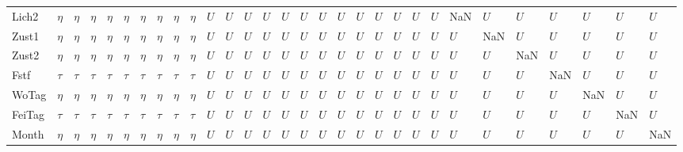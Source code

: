 \begin{tabular}{llllllllllllllllllllllllllllll}
Lich2  &    $\eta$ &    $\eta$ &    $\eta$ &    $\eta$ &    $\eta$ &    $\eta$ &    $\eta$ &    $\eta$ &    $\eta$ &     $U$ &     $U$ &     $U$ &     $U$ &     $U$ &     $U$ &     $U$ &     $U$ &     $U$ &       $U$ &     $U$ &     $U$ &     $U$ &     NaN &     $U$ &     $U$ &     $U$ &     $U$ &     $U$ &     $U$ \\
Zust1  &    $\eta$ &    $\eta$ &    $\eta$ &    $\eta$ &    $\eta$ &    $\eta$ &    $\eta$ &    $\eta$ &    $\eta$ &     $U$ &     $U$ &     $U$ &     $U$ &     $U$ &     $U$ &     $U$ &     $U$ &     $U$ &       $U$ &     $U$ &     $U$ &     $U$ &     $U$ &     NaN &     $U$ &     $U$ &     $U$ &     $U$ &     $U$ \\
Zust2  &    $\eta$ &    $\eta$ &    $\eta$ &    $\eta$ &    $\eta$ &    $\eta$ &    $\eta$ &    $\eta$ &    $\eta$ &     $U$ &     $U$ &     $U$ &     $U$ &     $U$ &     $U$ &     $U$ &     $U$ &     $U$ &       $U$ &     $U$ &     $U$ &     $U$ &     $U$ &     $U$ &     NaN &     $U$ &     $U$ &     $U$ &     $U$ \\
Fstf   &    $\tau$ &    $\tau$ &    $\tau$ &    $\tau$ &    $\tau$ &    $\tau$ &    $\tau$ &    $\tau$ &    $\tau$ &     $U$ &     $U$ &     $U$ &     $U$ &     $U$ &     $U$ &     $U$ &     $U$ &     $U$ &       $U$ &     $U$ &     $U$ &     $U$ &     $U$ &     $U$ &     $U$ &     NaN &     $U$ &     $U$ &     $U$ \\
WoTag  &    $\eta$ &    $\eta$ &    $\eta$ &    $\eta$ &    $\eta$ &    $\eta$ &    $\eta$ &    $\eta$ &    $\eta$ &     $U$ &     $U$ &     $U$ &     $U$ &     $U$ &     $U$ &     $U$ &     $U$ &     $U$ &       $U$ &     $U$ &     $U$ &     $U$ &     $U$ &     $U$ &     $U$ &     $U$ &     NaN &     $U$ &     $U$ \\
FeiTag &    $\tau$ &    $\tau$ &    $\tau$ &    $\tau$ &    $\tau$ &    $\tau$ &    $\tau$ &    $\tau$ &    $\tau$ &     $U$ &     $U$ &     $U$ &     $U$ &     $U$ &     $U$ &     $U$ &     $U$ &     $U$ &       $U$ &     $U$ &     $U$ &     $U$ &     $U$ &     $U$ &     $U$ &     $U$ &     $U$ &     NaN &     $U$ \\
Month  &    $\eta$ &    $\eta$ &    $\eta$ &    $\eta$ &    $\eta$ &    $\eta$ &    $\eta$ &    $\eta$ &    $\eta$ &     $U$ &     $U$ &     $U$ &     $U$ &     $U$ &     $U$ &     $U$ &     $U$ &     $U$ &       $U$ &     $U$ &     $U$ &     $U$ &     $U$ &     $U$ &     $U$ &     $U$ &     $U$ &     $U$ &     NaN \\
\bottomrule
\end{tabular}
